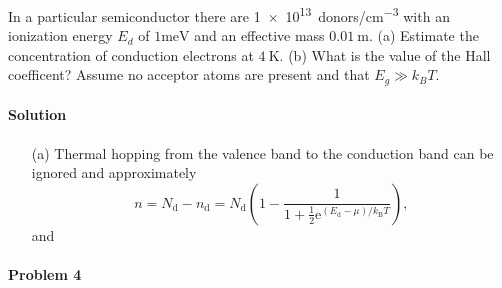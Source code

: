 \documentclass[hyperref, a4paper]{article}
\newcommand*{\ee}{\mathrm{e}}
\begin{document}
In a particular semiconductor there are \SI{1e13}{donors/cm^{-3}}
with an ionization energy $E_d$ of $1 \mathrm{meV}$ and an effective mass $0.01 \mathrm{~m}$. (a) Estimate the concentration of conduction electrons at $4 \mathrm{~K}$. (b) What is the value of the Hall coefficent? Assume no acceptor atoms are present and that $E_g \gg k_B T$.

\paragraph{Solution} \begin{itemize}
\item[(a)] Thermal hopping from the valence band to the conduction band can be ignored and 
approximately 
\begin{equation}
    n = N_{\text{d}} - n_{\text{d}} = N_{\text{d}} \left( 1 - 
    \frac{1}{ 1 + \frac{1}{2} \ee^{ (E_{\text{d}} - \mu) / k_{\text{B}} T } } \right) ,
\end{equation}
and 

\end{itemize}

\paragraph{Problem 4} 
\end{document}
